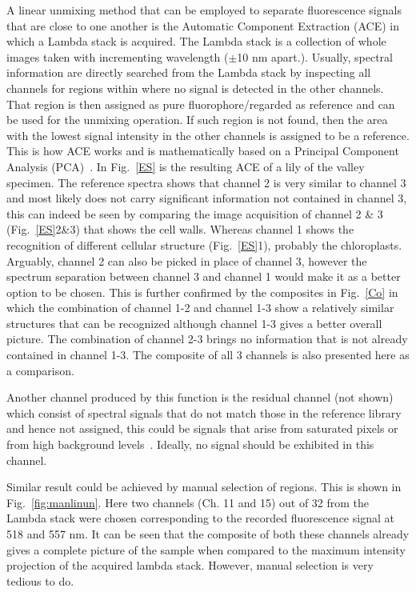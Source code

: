 A linear unmixing method that can be employed to separate fluorescence signals that are close to one another is the Automatic Component Extraction (ACE) in which a Lambda stack is acquired. 
The Lambda stack is a collection of whole images taken with incrementing wavelength ($\pm$10 nm apart.). 
Usually, spectral information are directly searched from the Lambda stack by inspecting all channels for regions within where no signal is detected in the other channels. 
That region is then assigned as pure fluorophore/regarded as reference and can be used for the unmixing operation. 
If such region is not found, then the area with the lowest signal intensity in the other channels is assigned to be a reference.
This is how ACE works and is mathematically based on a Principal Component Analysis (PCA)~\cite{ZeissCamp2}.
In Fig.~\ref{ES} is the resulting ACE of a lily of the valley specimen. 
The reference spectra shows that channel 2 is very similar to channel 3 and most likely does not carry significant information not contained in channel 3, this can indeed be seen by comparing the image acquisition of channel 2 \& 3 (Fig.~\ref{ES}2\&3) that shows the cell walls. 
Whereas channel 1 shows the recognition of different cellular structure (Fig.~\ref{ES}1), probably the chloroplasts. 
Arguably, channel 2 can also be picked in place of channel 3, however the spectrum separation between channel 3 and channel 1 would make it as a better option to be chosen. 
This is further confirmed by the composites in Fig.~\ref{Co} in which the combination of channel 1-2 and channel 1-3 show a relatively similar structures that can be recognized although channel 1-3 gives a better overall picture. 
The combination of channel 2-3 brings no information that is not already contained in channel 1-3. 
The composite of all 3 channels is also presented here as a comparison. 

Another channel produced by this function is the residual channel (not shown) which consist of spectral signals that do not match those in the reference library and hence not assigned, this could be signals that arise from saturated pixels or from high background levels~\cite{ZeissCamp2}. 
Ideally, no signal should be exhibited in this channel. 

Similar result could be achieved by manual selection of regions. 
This is shown in Fig.~\ref{fig:manlinun}. Here two channels (Ch. 11 and 15) out of 32 from the Lambda stack were chosen corresponding to the recorded fluorescence signal at 518 and 557 nm. 
It can be seen that the composite of both these channels already gives a complete picture of the sample when compared to the maximum intensity projection of the acquired lambda stack. 
However, manual selection is very tedious to do. 

